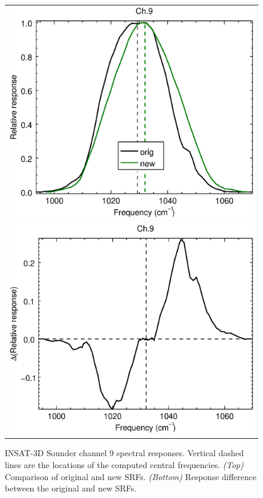 \begin{figure}[H]
  \centering
  \begin{tabular}{c}
    \includegraphics[scale=0.55]{graphics/sndr/srf/sndr_insat3d-9.eps} \\
    \includegraphics[scale=0.55]{graphics/sndr/srf/sndr_insat3d-9.difference.eps}
  \end{tabular}
  \caption{INSAT-3D Sounder channel 9 spectral responses. Vertical dashed lines are the locations of the computed central frequencies. \emph{(Top)} Comparison of original and new SRFs. \emph{(Bottom)} Response difference between the original and new SRFs.}
  \label{fig:sndr_ch9}
\end{figure}


